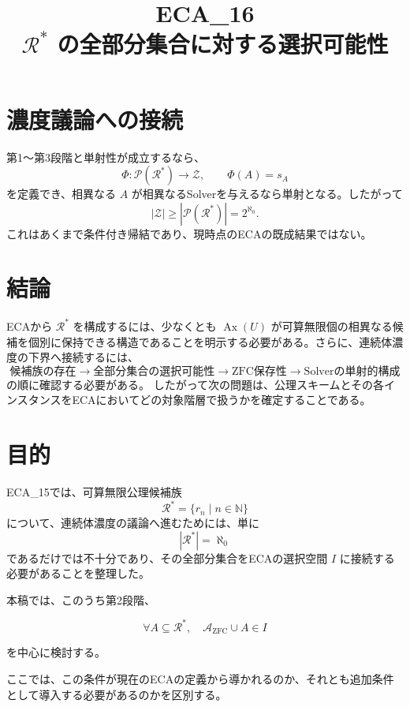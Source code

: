 \documentclass[11pt,a4paper]{article}
\begin{document}
\section{濃度議論への接続}
第1～第3段階と単射性が成立するなら、
\[
\Phi:\mathcal P(\mathcal R^*)\to\mathcal Z,\qquad \Phi(A)=s_A
\]
を定義でき、相異なる $A$ が相異なるSolverを与えるなら単射となる。したがって
\[
|\mathcal Z|\ge|\mathcal P(\mathcal R^*)|=2^{\aleph_0}.
\]
これはあくまで条件付き帰結であり、現時点のECAの既成結果ではない。

\section{結論}
ECAから $\mathcal R^*$ を構成するには、少なくとも $\operatorname{Ax}(U)$ が可算無限個の相異なる候補を個別に保持できる構造であることを明示する必要がある。さらに、連続体濃度の下界へ接続するには、
\[
\boxed{\text{候補族の存在}\to\text{全部分集合の選択可能性}\to\text{ZFC保存性}\to\text{Solverの単射的構成}}
\]
の順に確認する必要がある。
したがって次の問題は、公理スキームとその各インスタンスをECAにおいてどの対象階層で扱うかを確定することである。
























\title{ECA\_16\\$\mathcal R^*$ の全部分集合に対する選択可能性}

\section{目的}

ECA\_15では、可算無限公理候補族
\[
\mathcal R^*=\{r_n\mid n\in\mathbb N\}
\]
について、連続体濃度の議論へ進むためには、単に
\[
|\mathcal R^*|=\aleph_0
\]
であるだけでは不十分であり、その全部分集合をECAの選択空間 $I$ に接続する必要があることを整理した。

本稿では、このうち第2段階、

\[
\boxed{
\forall A\subseteq\mathcal R^*,
\quad
\mathcal A_{\mathrm{ZFC}}\cup A\in I
}
\]

を中心に検討する。

ここでは、この条件が現在のECAの定義から導かれるのか、それとも追加条件として導入する必要があるのかを区別する。
\end{document}

